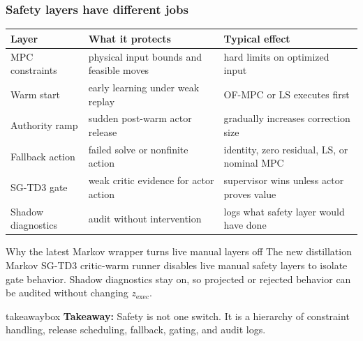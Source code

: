 \documentclass[aspectratio=169]{beamer}
\newcommand{\takeawaybox}[1]{%
\vspace{0.02cm}
\begin{center}
\begin{beamercolorbox}[wd=0.94\textwidth,sep=3pt,center,rounded=true,shadow=false]{takeawaybox}
\scriptsize
\textbf{\textcolor{maroon1}{Takeaway:}} #1
\end{beamercolorbox}
\end{center}
}
\begin{document}
\begin{frame}
\frametitle{\large \textbf{Safety layers have different jobs}}
\scriptsize

\begin{center}
\tiny
\renewcommand{\arraystretch}{1.2}
\begin{tabular}{p{}p{}p{}}
\toprule
\textbf{Layer} & \textbf{What it protects} & \textbf{Typical effect}\\
\midrule
MPC constraints & physical input bounds and feasible moves & hard limits on optimized input\\
Warm start & early learning under weak replay & OF-MPC or LS executes first\\
Authority ramp & sudden post-warm actor release & gradually increases correction size\\
Fallback action & failed solve or nonfinite action & identity, zero residual, LS, or nominal MPC\\
SG-TD3 gate & weak critic evidence for actor action & supervisor wins unless actor proves value\\
Shadow diagnostics & audit without intervention & logs what safety layer would have done\\
\bottomrule
\end{tabular}
\end{center}

\vspace{0.05cm}
\begin{block}{Why the latest Markov wrapper turns live manual layers off}
The new distillation Markov SG-TD3 critic-warm runner disables live manual safety layers to isolate gate behavior. Shadow diagnostics stay on, so projected or rejected behavior can be audited without changing \(z_{\mathrm{exec}}\).
\end{block}

\takeawaybox{Safety is not one switch. It is a hierarchy of constraint handling, release scheduling, fallback, gating, and audit logs.}
\end{frame}
\end{document}

